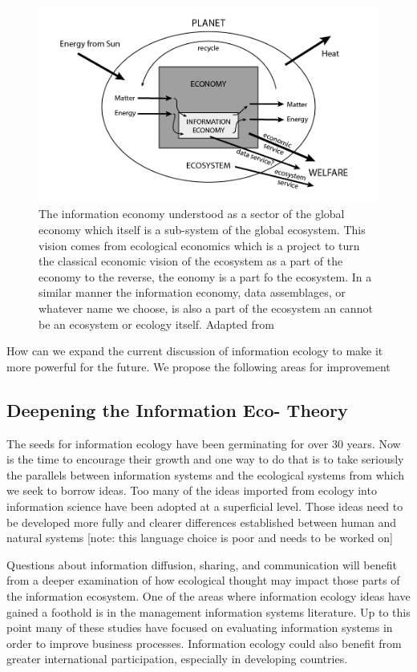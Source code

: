 \begin{figure}[!ht]
  \centering
    \includegraphics[width=1.0\textwidth]{figures/EcolEcon}
  \caption{The information economy understood as a sector of the global economy which itself is a sub-system of the global ecosystem. This vision comes from ecological economics which is a project to turn the classical economic vision of the ecosystem as a part of the economy to the reverse, the eonomy is a part fo the ecosystem. In a similar manner the information economy, data assemblages, or whatever name we choose, is also a part of the ecosystem an cannot be an ecosystem or ecology itself. Adapted from \citep[][p. 18]{daly_2004}}
\end{figure}

How can we expand the current discussion of information ecology to make it more powerful for the future. We propose the following areas for improvement

\subsection{Deepening the Information Eco- Theory}

The seeds for information ecology have been germinating for over 30 years. Now is the time to encourage their growth and one way to do that is to take seriously the parallels between information systems and the ecological systems from which we seek to borrow ideas. Too many of the ideas imported from ecology into information science have been adopted at a superficial level. Those ideas need to be developed more fully and clearer differences established between human and natural systems [note: this language choice is poor and needs to be worked on]

Questions about information diffusion, sharing, and communication will benefit from a deeper examination of how ecological thought may impact those parts of the information ecosystem. One of the areas where information ecology ideas have gained a foothold is in the management information systems literature. Up to this point many of these studies have focused on evaluating information systems in order to improve business processes. Information ecology could also benefit from greater international participation, especially in developing countries. \citep{wang_information_2015}

